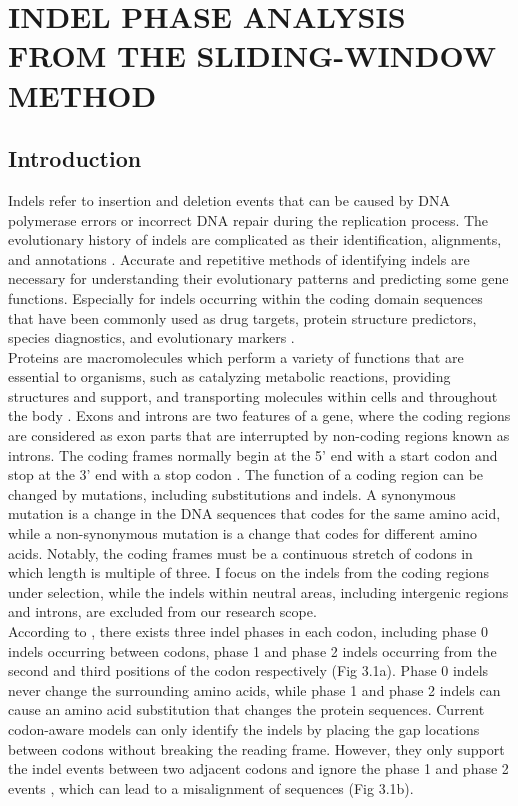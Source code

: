 \chapter{\normalfont INDEL PHASE ANALYSIS FROM THE SLIDING-WINDOW METHOD}
\label{ch:indel_phase}

\section{Introduction}
Indels refer to insertion and deletion events that can be caused by DNA polymerase errors or incorrect DNA repair during the replication process. The evolutionary history of indels are complicated as their identification, alignments, and annotations \parencite{kunkel2004dna}. Accurate and repetitive methods of identifying indels are necessary for understanding their evolutionary patterns and predicting some gene functions. Especially for indels occurring within the coding domain sequences that have been commonly used as drug targets, protein structure predictors, species diagnostics, and evolutionary markers \parencite{ajawatanawong2013evolution}. \\
\indent Proteins are macromolecules which perform a variety of functions that are essential to organisms, such as catalyzing metabolic reactions, providing structures and support, and transporting molecules within cells and throughout the body \parencite{cozzone2002proteins}. Exons and introns are two features of a gene, where the coding regions are considered as exon parts that are interrupted by non-coding regions known as introns. The coding frames normally begin at the 5’ end with a start codon and stop at the 3’ end with a stop codon \parencite{furuno2003cds}. The function of a coding region can be changed by mutations, including substitutions and indels. A synonymous mutation is a change in the DNA sequences that codes for the same amino acid, while a non-synonymous mutation is a change that codes for different amino acids. Notably, the coding frames must be a continuous stretch of codons in which length is multiple of three. I focus on the indels from the coding regions under selection, while the indels within neutral areas, including intergenic regions and introns, are excluded from our research scope. \\
\indent According to \citeauthor{taylor2004occurrence}, there exists three indel phases in each codon, including phase 0 indels occurring between codons, phase 1 and phase 2 indels occurring from the second and third positions of the codon respectively (Fig 3.1a). Phase 0 indels never change the surrounding amino acids, while phase 1 and phase 2 indels can cause an amino acid substitution that changes the protein sequences. Current codon-aware models can only identify the indels by placing the gap locations between codons without breaking the reading frame. However, they only support the indel events between two adjacent codons and ignore the phase 1 and phase 2 events \parencite{kosiol2007empirical}, which can lead to a misalignment of sequences (Fig 3.1b). \\
